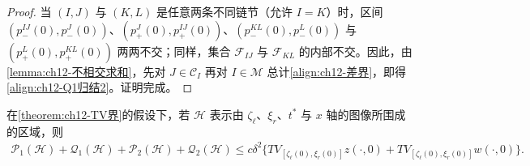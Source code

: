 \documentclass[../../main.tex]{subfiles}
\begin{document}
\begin{proof}
当 $(I,J)$ 与 $(K,L)$ 是任意两条不同链节（允许 $I=K$）时，区间 $(p_-^{IJ}(0),p_-^J(0))$、$(p_+^J(0),p_+^{IJ}(0))$、$(p_-^{KL}(0),p_-^L(0))$ 与 $(p_+^L(0),p_+^{KL}(0))$ 两两不交；同样，集合 $\mathscr{F}_{IJ}$ 与 $\mathscr{F}_{KL}$ 的内部不交。因此，由\cref{lemma:ch12-不相交求和}，先对 $J\in\mathscr{C}_I$ 再对 $I\in\mathscr{M}$ 总计\eqref{align:ch12-差界}，即得\eqref{align:ch12-Q1归结2}。证明完成。
\end{proof}

\begin{lemma}\label{lemma:ch12-相互作用有界}
在\cref{theorem:ch12-TV界}的假设下，若 $\mathscr{H}$ 表示由 $\zeta_\ell$、$\xi_r$、$t^*$ 与 $x$ 轴的图像所围成的区域，则
\begin{align}
\mathscr{P}_1(\mathscr{H})+\mathscr{Q}_1(\mathscr{H})+\mathscr{P}_2(\mathscr{H})+\mathscr{Q}_2(\mathscr{H})
\leqslant c\delta^2\{TV_{[\zeta_\ell(0),\xi_r(0)]}z(\cdot,0)+TV_{[\zeta_\ell(0),\xi_r(0)]}w(\cdot,0)\}.
\label{align:ch12-相互作用有界}
\end{align}
\end{lemma}
\end{document}
